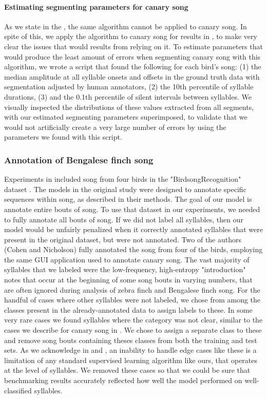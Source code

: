 \documentclass[9pt,lineno]{elife}
\begin{document}
\paragraph{Estimating segmenting parameters for canary song}
As we state in the , 
the same algorithm cannot be applied to canary song.
In spite of this, 
we apply the algorithm to canary song for results in ,
to make very clear the issues that would results from relying on it. 
To estimate parameters that would produce the least amount of errors when 
segmenting canary song with this algorithm, 
we wrote a script that found the following for each bird's song: 
(1) the median amplitude at all syllable onsets and offsets 
in the ground truth data with 
segmentation adjusted by human annotators, 
(2) the 10th percentile of syllable durations, 
(3) and the 0.1th percentile of silent intervals between syllables.
We visually inspected the distributions of these values 
extracted from all segments,
with our estimated segmenting parameters superimposed, 
to validate that we would not 
artificially create a very large number of errors 
by using the parameters we found with this script.

\subsubsection{Annotation of Bengalese finch song}
\label{methods:annot-bf}
Experiments in  
included song from four birds in the "BirdsongRecognition" dataset \citep{koumura_birdsongrecognition_2016}.
The models in the original study were designed to annotate specific sequences within song, 
as described in their methods.
The goal of our model is annotate entire bouts of song.
To use that dataset in our experiments, we needed to fully annotate all bouts of song.
If we did not label all syllables, then our model would be unfairly penalized 
when it correctly annotated syllables that were present in the original dataset, 
but were not annotated.
Two of the authors (Cohen and Nicholson) 
fully annotated the song from four of the birds, 
employing the same GUI application used to annotate canary song.
The vast majority of syllables 
that we labeled were the low-frequency, high-entropy "introduction" notes 
that occur at the beginning of some song bouts in varying numbers, 
that are often ignored during analysis of zebra finch and Bengalese finch song.
For the handful of cases where other syllables were not labeled, 
we chose from among the classes present in the already-annotated data to 
assign labels to these.
In some very rare cases we found syllables where the category was not clear, 
similar to the cases we describe for canary song in .
We chose to assign a separate class to these and 
remove song bouts containing theses classes from both the training and test sets.
As we acknowledge in  and , 
an inability to handle edge cases like these is a limitation of 
any standard supervised learning algorithm like ours, that operates at the level of syllables. 
We removed these cases so that we could be sure that benchmarking results 
accurately reflected how well the model performed on well-classified syllables.
\end{document}
